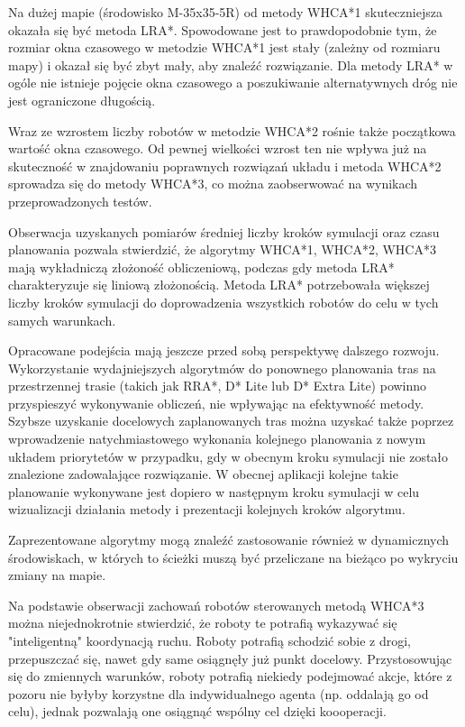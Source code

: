 Na dużej mapie (środowisko M-35x35-5R) od metody WHCA*1 skuteczniejsza okazała się być metoda LRA*. Spowodowane jest to prawdopodobnie tym, że rozmiar okna czasowego w metodzie WHCA*1 jest stały (zależny od rozmiaru mapy) i okazał się być zbyt mały, aby znaleźć rozwiązanie. Dla metody LRA* w ogóle nie istnieje pojęcie okna czasowego a poszukiwanie alternatywnych dróg nie jest ograniczone długością.

Wraz ze wzrostem liczby robotów w metodzie WHCA*2 rośnie także początkowa wartość okna czasowego.
Od pewnej wielkości wzrost ten nie wpływa już na skuteczność w znajdowaniu poprawnych rozwiązań układu i metoda WHCA*2 sprowadza się do metody WHCA*3, co można zaobserwować na wynikach przeprowadzonych testów.

Obserwacja uzyskanych pomiarów średniej liczby kroków symulacji oraz czasu planowania pozwala stwierdzić, że algorytmy WHCA*1, WHCA*2, WHCA*3 mają wykładniczą złożoność obliczeniową, podczas gdy metoda LRA* charakteryzuje się liniową złożonością.
Metoda LRA* potrzebowała większej liczby kroków symulacji do doprowadzenia wszystkich robotów do celu w tych samych warunkach.


Opracowane podejścia mają jeszcze przed sobą perspektywę dalszego rozwoju.
Wykorzystanie wydajniejszych algorytmów do ponownego planowania tras na przestrzennej trasie (takich jak RRA*, D* Lite lub D* Extra Lite) powinno przyspieszyć wykonywanie obliczeń, nie wpływając na efektywność metody.
Szybsze uzyskanie docelowych zaplanowanych tras można uzyskać także poprzez wprowadzenie natychmiastowego wykonania kolejnego planowania z nowym układem priorytetów w przypadku, gdy w obecnym kroku symulacji nie zostało znalezione zadowalające rozwiązanie.
W obecnej aplikacji kolejne takie planowanie wykonywane jest dopiero w następnym kroku symulacji w celu wizualizacji działania metody i prezentacji kolejnych kroków algorytmu.

Zaprezentowane algorytmy mogą znaleźć zastosowanie również w dynamicznych środowiskach, w których to ścieżki muszą być przeliczane na bieżąco po wykryciu zmiany na mapie.

Na podstawie obserwacji zachowań robotów sterowanych metodą WHCA*3 można niejednokrotnie stwierdzić, że roboty te potrafią wykazywać się "inteligentną" koordynacją ruchu.
Roboty potrafią schodzić sobie z drogi, przepuszczać się, nawet gdy same osiągnęły już punkt docelowy.
Przystosowując się do zmiennych warunków, roboty potrafią niekiedy podejmować akcje, które z pozoru nie byłyby korzystne dla indywidualnego agenta (np. oddalają go od celu), jednak pozwalają one osiągnąć wspólny cel dzięki koooperacji.
